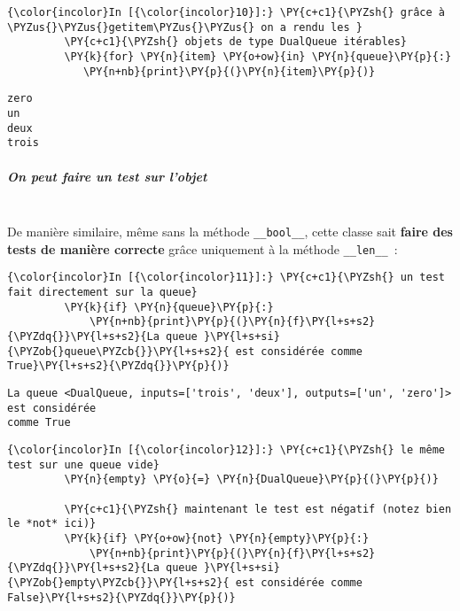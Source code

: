     \begin{Verbatim}[commandchars=\\\{\}]
{\color{incolor}In [{\color{incolor}10}]:} \PY{c+c1}{\PYZsh{} grâce à \PYZus{}\PYZus{}getitem\PYZus{}\PYZus{} on a rendu les }
         \PY{c+c1}{\PYZsh{} objets de type DualQueue itérables}
         \PY{k}{for} \PY{n}{item} \PY{o+ow}{in} \PY{n}{queue}\PY{p}{:}
            \PY{n+nb}{print}\PY{p}{(}\PY{n}{item}\PY{p}{)}
\end{Verbatim}


    \begin{Verbatim}[commandchars=\\\{\}]
zero
un
deux
trois

    \end{Verbatim}

    \hypertarget{on-peut-faire-un-test-sur-lobjet}{%
\subparagraph{On peut faire un test sur
l'objet\\\\}\label{on-peut-faire-un-test-sur-lobjet}}

    De manière similaire, même sans la méthode \texttt{\_\_bool\_\_}, cette
classe sait \textbf{faire des tests de manière correcte} grâce
uniquement à la méthode \texttt{\_\_len\_\_}~:

    \begin{Verbatim}[commandchars=\\\{\}]
{\color{incolor}In [{\color{incolor}11}]:} \PY{c+c1}{\PYZsh{} un test fait directement sur la queue}
         \PY{k}{if} \PY{n}{queue}\PY{p}{:}
             \PY{n+nb}{print}\PY{p}{(}\PY{n}{f}\PY{l+s+s2}{\PYZdq{}}\PY{l+s+s2}{La queue }\PY{l+s+si}{\PYZob{}queue\PYZcb{}}\PY{l+s+s2}{ est considérée comme True}\PY{l+s+s2}{\PYZdq{}}\PY{p}{)}
\end{Verbatim}


    \begin{Verbatim}[commandchars=\\\{\}]
La queue <DualQueue, inputs=['trois', 'deux'], outputs=['un', 'zero']> est considérée
comme True

    \end{Verbatim}

    \begin{Verbatim}[commandchars=\\\{\}]
{\color{incolor}In [{\color{incolor}12}]:} \PY{c+c1}{\PYZsh{} le même test sur une queue vide}
         \PY{n}{empty} \PY{o}{=} \PY{n}{DualQueue}\PY{p}{(}\PY{p}{)}
         
         \PY{c+c1}{\PYZsh{} maintenant le test est négatif (notez bien le *not* ici)}
         \PY{k}{if} \PY{o+ow}{not} \PY{n}{empty}\PY{p}{:}
             \PY{n+nb}{print}\PY{p}{(}\PY{n}{f}\PY{l+s+s2}{\PYZdq{}}\PY{l+s+s2}{La queue }\PY{l+s+si}{\PYZob{}empty\PYZcb{}}\PY{l+s+s2}{ est considérée comme False}\PY{l+s+s2}{\PYZdq{}}\PY{p}{)}
\end{Verbatim}


